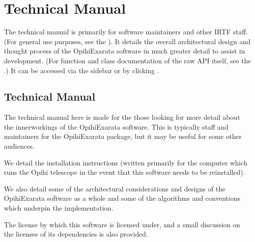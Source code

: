 \documentclass[letterpaper,11pt,english]{sphinxmanual}
\begin{document}
\chapter{Technical Manual}
\label{\detokenize{index:technical-manual}}\label{\detokenize{index:home-technical-manual}}
\sphinxAtStartPar
The technical manual is primarily for software maintainers and other IRTF
staff. (For general use purposes, see the {\hyperref[\detokenize{index:home-user-manual}]{}}).
It details the overall architectural design and thought process of the
OpihiExarata software in much greater detail to assist in development. (For
function and class documentation of the raw API itself, see the
{\hyperref[\detokenize{index:home-technical-manual}]{}}.) It can be accessed via the sidebar or by
clicking {\hyperref[\detokenize{technical/index::doc}]{}}.

\sphinxstepscope


\section{Technical Manual}
\label{\detokenize{technical/index:technical-manual}}\label{\detokenize{technical/index:technical-index}}\label{\detokenize{technical/index::doc}}
\sphinxAtStartPar
The technical manual here is made for the those looking for more detail about
the inner\sphinxhyphen{}workings of the OpihiExarata software. This is typically staff and
maintainers for the OpihiExarata package, but it may be useful for some other
audiences.

\sphinxAtStartPar
We detail the installation instructions (written primarily for the computer
which runs the Opihi telescope in the event that this software needs to be
reinstalled).

\sphinxAtStartPar
We also detail some of the architectural considerations and designs of the
OpihiExarata software as a whole and some of the algorithms and conventions
which underpin the implementation.

\sphinxAtStartPar
The license by which this software is licensed under, and a small discussion
on the licenses of its dependencies is also provided.

\sphinxstepscope
\end{document}
